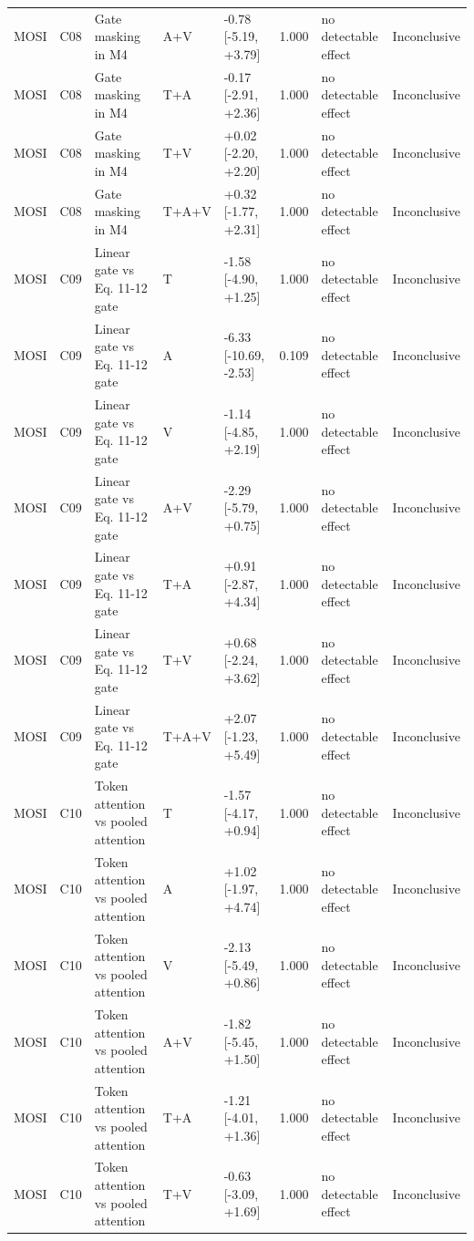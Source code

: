 \begin{landscape}
{\begin{xltabular}{\linewidth}{ll>{\raggedright\arraybackslash}Xlll>{\raggedright\arraybackslash}X>{\raggedright\arraybackslash}X}
MOSI & C08 & Gate masking in M4 & A+V & -0.78 [-5.19, +3.79] & 1.000 & no detectable effect & Inconclusive \\
MOSI & C08 & Gate masking in M4 & T+A & -0.17 [-2.91, +2.36] & 1.000 & no detectable effect & Inconclusive \\
MOSI & C08 & Gate masking in M4 & T+V & +0.02 [-2.20, +2.20] & 1.000 & no detectable effect & Inconclusive \\
MOSI & C08 & Gate masking in M4 & T+A+V & +0.32 [-1.77, +2.31] & 1.000 & no detectable effect & Inconclusive \\
MOSI & C09 & Linear gate vs Eq. 11-12 gate & T & -1.58 [-4.90, +1.25] & 1.000 & no detectable effect & Inconclusive \\
MOSI & C09 & Linear gate vs Eq. 11-12 gate & A & -6.33 [-10.69, -2.53] & 0.109 & no detectable effect & Inconclusive \\
MOSI & C09 & Linear gate vs Eq. 11-12 gate & V & -1.14 [-4.85, +2.19] & 1.000 & no detectable effect & Inconclusive \\
MOSI & C09 & Linear gate vs Eq. 11-12 gate & A+V & -2.29 [-5.79, +0.75] & 1.000 & no detectable effect & Inconclusive \\
MOSI & C09 & Linear gate vs Eq. 11-12 gate & T+A & +0.91 [-2.87, +4.34] & 1.000 & no detectable effect & Inconclusive \\
MOSI & C09 & Linear gate vs Eq. 11-12 gate & T+V & +0.68 [-2.24, +3.62] & 1.000 & no detectable effect & Inconclusive \\
MOSI & C09 & Linear gate vs Eq. 11-12 gate & T+A+V & +2.07 [-1.23, +5.49] & 1.000 & no detectable effect & Inconclusive \\
MOSI & C10 & Token attention vs pooled attention & T & -1.57 [-4.17, +0.94] & 1.000 & no detectable effect & Inconclusive \\
MOSI & C10 & Token attention vs pooled attention & A & +1.02 [-1.97, +4.74] & 1.000 & no detectable effect & Inconclusive \\
MOSI & C10 & Token attention vs pooled attention & V & -2.13 [-5.49, +0.86] & 1.000 & no detectable effect & Inconclusive \\
MOSI & C10 & Token attention vs pooled attention & A+V & -1.82 [-5.45, +1.50] & 1.000 & no detectable effect & Inconclusive \\
MOSI & C10 & Token attention vs pooled attention & T+A & -1.21 [-4.01, +1.36] & 1.000 & no detectable effect & Inconclusive \\
MOSI & C10 & Token attention vs pooled attention & T+V & -0.63 [-3.09, +1.69] & 1.000 & no detectable effect & Inconclusive \\

\end{xltabular}}
\end{landscape}
